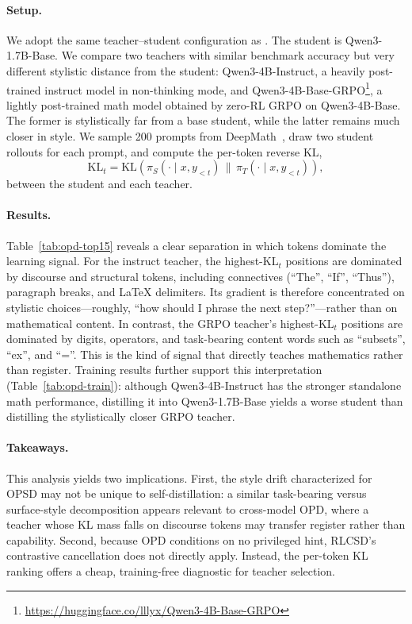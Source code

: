 \paragraph{Setup.}
We adopt the same teacher--student configuration as \citet{li2026rethinking}. The student is Qwen3-1.7B-Base. We compare two teachers with similar benchmark accuracy but very different stylistic distance from the student: Qwen3-4B-Instruct, a heavily post-trained instruct model in non-thinking mode, and Qwen3-4B-Base-GRPO\footnote{\url{https://huggingface.co/lllyx/Qwen3-4B-Base-GRPO}}, a lightly post-trained math model obtained by zero-RL GRPO on Qwen3-4B-Base. The former is stylistically far from a base student, while the latter remains much closer in style. We sample 200 prompts from DeepMath~\citep{he2025deepmath}, draw two student rollouts for each prompt, and compute the per-token reverse KL,
\[
\mathrm{KL}_t = \mathrm{KL}\!\left( \pi_S(\cdot \mid x, y_{<t}) \,\|\, \pi_T(\cdot \mid x, y_{<t}) \right),
\]
between the student and each teacher.

\paragraph{Results.}
Table~\ref{tab:opd-top15} reveals a clear separation in which tokens dominate the learning signal. For the instruct teacher, the highest-$\mathrm{KL}_t$ positions are dominated by discourse and structural tokens, including connectives (``The'', ``If'', ``Thus''), paragraph breaks, and LaTeX delimiters. Its gradient is therefore concentrated on stylistic choices---roughly, ``how should I phrase the next step?''---rather than on mathematical content. In contrast, the GRPO teacher's highest-$\mathrm{KL}_t$ positions are dominated by digits, operators, and task-bearing content words such as ``subsets'', ``ex'', and ``=''. This is the kind of signal that directly teaches mathematics rather than register. Training results further support this interpretation (Table~\ref{tab:opd-train}): although Qwen3-4B-Instruct has the stronger standalone math performance, distilling it into Qwen3-1.7B-Base yields a worse student than distilling the stylistically closer GRPO teacher.


\paragraph{Takeaways.}
This analysis yields two implications. First, the style drift characterized for OPSD may not be unique to self-distillation: a similar task-bearing versus surface-style decomposition appears relevant to cross-model OPD, where a teacher whose KL mass falls on discourse tokens may transfer register rather than capability. Second, because OPD conditions on no privileged hint, RLCSD's contrastive cancellation does not directly apply. Instead, the per-token KL ranking offers a cheap, training-free diagnostic for teacher selection.

